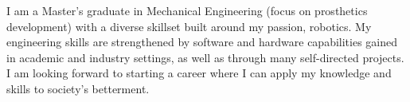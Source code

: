 

\begin{cvparagraph}

I am a Master's graduate in Mechanical Engineering (focus on prosthetics development) with a diverse
skillset built around my passion, robotics. My engineering skills are strengthened by software and hardware
capabilities gained in academic and industry settings, as well as through many self-directed projects. I am looking
forward to starting a career where I can apply my knowledge and skills to society's betterment.

\end{cvparagraph}
